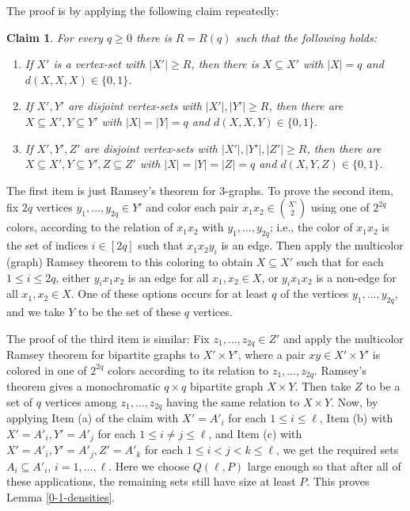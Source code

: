 \documentclass[11pt]{article}
\let\oldendproof\endproof
\renewenvironment{proof}[1][\proofname]{%
	\oldproof[\bf #1]%
}{\oldendproof}
\theoremstyle{plain}
\newtheorem{claim}[theorem]{Claim}
\begin{document}
\begin{proof}
    The proof is by applying the following claim repeatedly:
    \begin{claim}
       For every $q \geq 0$ there is $R = R(q)$ such that the following holds:
       \begin{enumerate}
           \item[(a)] If $X'$ is a vertex-set with $|X'| \geq R$, then there is $X \subseteq X'$ with $|X| = q$ and $d(X,X,X) \in \{0,1\}$. 
           \item[(b)] If $X',Y'$ are disjoint vertex-sets with $|X'|,|Y'| \geq R$, then there are $X \subseteq X', Y \subseteq Y'$ with $|X| = |Y| = q$ and $d(X,X,Y) \in \{0,1\}$. 
           \item[(c)] If $X',Y',Z'$ are disjoint vertex-sets with $|X'|,|Y'|,|Z'| \geq R$, then there are $X \subseteq X', Y \subseteq Y', Z \subseteq Z'$ with $|X| = |Y| = |Z| = q$ and $d(X,Y,Z) \in \{0,1\}$.
       \end{enumerate}
    \end{claim}
    \begin{proof}
        The first item is just Ramsey's theorem for 3-graphs. To prove the second item, fix $2q$ vertices $y_1,\dots,y_{2q} \in Y'$ and color each pair $x_1x_2 \in \binom{X'}{2}$ using one of $2^{2q}$ colors, according to the relation of $x_1x_2$ with $y_1,\dots,y_{2q}$; i.e., the color of $x_1x_2$ is the set of indices $i \in [2q]$ such that $x_1x_2y_i$ is an edge. Then apply the multicolor (graph) Ramsey theorem to this coloring to obtain $X \subseteq X'$ such that for each $1 \leq i \leq 2q$, either $y_ix_1x_2$ is an edge for all $x_1,x_2 \in X$, or $y_ix_1x_2$ is a non-edge for all $x_1,x_2 \in X$. One of these options occurs for at least $q$ of the vertices $y_1,\dots,y_{2q}$, and we take $Y$ to be the set of these $q$ vertices.  

       The proof of the third item is similar: Fix $z_1,\dots,z_{2q} \in Z'$ and apply the multicolor Ramsey theorem for bipartite graphs to $X' \times Y'$, where a pair $xy \in X' \times Y'$ is colored in one of $2^{2q}$ colors according to its relation to $z_1,\dots,z_{2q}$. Ramsey's theorem gives a monochromatic $q \times q$ bipartite graph $X \times Y$. Then take $Z$ to be a set of $q$ vertices among $z_1,\dots,z_{2q}$ having the same relation \nolinebreak to \nolinebreak $X \times Y$.
    \end{proof}
    Now, by applying Item (a) of the claim with $X' = A'_i$ for each $1 \leq i \leq \ell$, Item (b) with $X' = A'_i, Y' = A'_j$ for each $1 \leq i \neq j \leq \ell$, and Item (c) with $X'=A'_i,Y'=A'_j,Z'=A'_k$ for each $1 \leq i < j < k \leq \ell$, we get the required sets $A_i \subseteq A'_i$, $i=1,\dots,\ell$. Here we choose $Q(\ell,P)$ large enough so that after all of these applications, the remaining sets still have size at least $P$. This proves Lemma \ref{0-1-densities}.
\end{proof}
\end{document}
